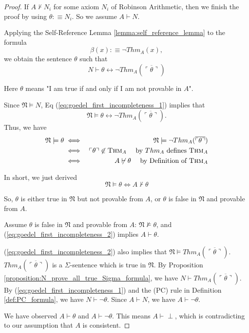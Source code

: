 \documentclass[11pt,letterpaper]{book}
\theoremstyle{definition}
\begin{document}
\begin{proof}
If $A \not \vdash N_i$ for some axiom $N_i$ of Robinson Arithmetic, then we finish the proof by using $\theta :\equiv N_i$. So we assume $A \vdash N$.

Applying the Self-Reference Lemma \ref{lemma:self_reference_lemma} to the formula 
$$ \beta (x) : \equiv \lnot Thm_A (x) ,$$
we obtain the sentence $\theta$ such that
\begin{equation}
N \vdash \theta \leftrightarrow \lnot Thm_A ( \overline{\ulcorner \theta \urcorner} ) \label{eq:goedel_first_incompleteness_1} \tag{*}
\end{equation}

Here $\theta$ means "I am true if and only if I am not provable in $A$".

Since $\mathfrak{N} \models N$, Eq (\ref{eq:goedel_first_incompleteness_1}) implies that
$$ \mathfrak{N} \models \theta \leftrightarrow \lnot Thm_A ( \overline{\ulcorner \theta \urcorner} ) . $$
Thus, we have
\begin{eqnarray*}
\mathfrak{N} \models \theta &\iff & \mathfrak{N} \models \lnot Thm_A ( \overline{\ulcorner \theta \urcorner} ) \\
& \iff & \ulcorner \theta \urcorner \not \in \text{\textsc{Thm}}_A \quad \text{ by $Thm_A$ defines }\text{\textsc{Thm}}_A \\
& \iff & A \not \vdash \theta \quad \text{ by Definition of } \text{\textsc{Thm}}_A
\end{eqnarray*}

In short, we just derived
\begin{equation}
\label{eq:goedel_first_incompleteness_2}
\mathfrak{N} \models \theta \iff A \not \vdash \theta \tag{**}
\end{equation}

So, $\theta$ is either true in $\mathfrak{N}$ but not provable from $A$, or $\theta$ is false in $\mathfrak{N}$ and provable from $A$.


Assume $\theta$ is false in $\mathfrak{N}$ and provable from $A$: $\mathfrak{N} \not \models \theta$, and (\ref{eq:goedel_first_incompleteness_2}) implies $A \vdash \theta$.

(\ref{eq:goedel_first_incompleteness_2}) also implies that $\mathfrak{N} \models Thm_A ( \overline{\ulcorner \theta \urcorner} ) $. 
$Thm_A ( \overline{\ulcorner \theta \urcorner} )$ is a $\Sigma$-sentence which is true in $\mathfrak{N}$. By Proposition \ref{proposition:N_prove_all_true_Sigma_formula}, we have $N \vdash Thm_A ( \overline{\ulcorner \theta \urcorner} )$. By (\ref{eq:goedel_first_incompleteness_1}) and the (PC) rule in Definition \ref{def:PC_formula}, we have $N \vdash \lnot \theta$. Since $A \vdash N$, we have $A \vdash \lnot \theta$. 

We have observed $A \vdash \theta$ and $A \vdash \lnot \theta$. This means $A \vdash \perp$, which is contradicting to our assumption that $A$ is consistent.

\end{proof}
\end{document}
